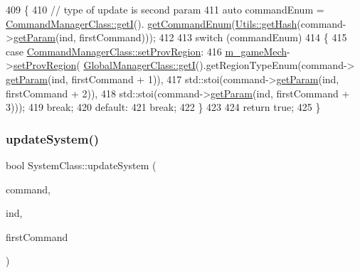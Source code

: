 \begin{DoxyCode}
409 \{
410     \textcolor{comment}{// type of update is second param}
411     \textcolor{keyword}{auto} commandEnum = \hyperlink{class_command_manager_class_a5086ba410f5bb7af25db58e9c5b16d27}{CommandManagerClass::getI}().
      \hyperlink{class_command_manager_class_a18080e9ab4d0890282cde8dd668dc87e}{getCommandEnum}(\hyperlink{class_utils_aad2252ad39d512678c7a50ff2afc8023}{Utils::getHash}(command->\hyperlink{class_command_class_ac5cd41b5644c2a0b076b3e7f18b79b1a}{getParam}(ind, firstCommand)));
412 
413     \textcolor{keywordflow}{switch} (commandEnum)
414     \{
415     \textcolor{keywordflow}{case} \hyperlink{class_command_manager_class_aff5b4b6301c24b585b22c6abaf4f3131a51c2ef9e825eefd2796a6153d96f9fdb}{CommandManagerClass::setProvRegion}:
416         \hyperlink{class_system_class_a536ff2a3fa38a758f694c2dc01219daf}{m\_gameMech}->\hyperlink{class_game_mechanic_class_a1bb457c34d4cb7ca53589f99c8a2a540}{setProvRegion}(
      \hyperlink{class_global_manager_class_ac6cf763853c150bb15e0a5bda7f5f66c}{GlobalManagerClass::getI}().getRegionTypeEnum(command->
      \hyperlink{class_command_class_ac5cd41b5644c2a0b076b3e7f18b79b1a}{getParam}(ind, firstCommand + 1)),
417             std::stoi(command->\hyperlink{class_command_class_ac5cd41b5644c2a0b076b3e7f18b79b1a}{getParam}(ind, firstCommand + 2)),
418             std::stoi(command->\hyperlink{class_command_class_ac5cd41b5644c2a0b076b3e7f18b79b1a}{getParam}(ind, firstCommand + 3)));
419         \textcolor{keywordflow}{break};
420     \textcolor{keywordflow}{default}:
421         \textcolor{keywordflow}{break};
422     \}
423 
424     \textcolor{keywordflow}{return} \textcolor{keyword}{true};
425 \}
\end{DoxyCode}
\mbox{\label{group__commands_ga19c15f7c6bc2743a04fcac998ab17677}} 
\subsubsection{\texorpdfstring{update\+System()}{updateSystem()}}
{\footnotesize\ttfamily bool System\+Class\+::update\+System (\begin{DoxyParamCaption}\item[{\hyperlink{class_command_class}{Command\+Class} $\ast$}]{command,  }\item[{int}]{ind,  }\item[{int}]{first\+Command }\end{DoxyParamCaption})\hspace{0.3cm}{\ttfamily [private]}}



